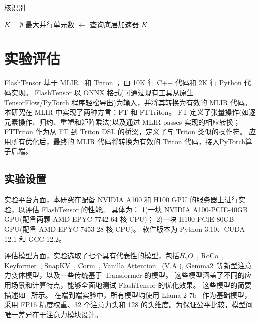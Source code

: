 \begin{algorithm}[ht]
{
\caption{核识别}
    \label{alg:kernel_identify}
     { 
        $K = \emptyset $\; 
        最大并行单元数 $\leftarrow$ 查询底层加速器\;
        \Return $K$\;
    }
}
\end{algorithm}

\section{实验评估}
FlashTensor 基于 MLIR~\cite {lattner2020mlir} 和 Triton~\cite {tillet2019triton}，由 10K 行 C++ 代码和 2K 行 Python 代码实现。
FlashTensor 以 ONNX 格式(可通过现有工具从原生 TensorFlow/PyTorch 程序轻松导出)为输入，并将其转换为有效的 MLIR 代码。
本研究在 MLIR 中实现了两种方言：FT 和 FTTriton。
FT 定义了张量操作(如逐元素操作、归约、重塑和矩阵乘法)以及通过 MLIR passes 实现的相应转换；
FTTriton 作为从 FT 到 Triton DSL 的桥梁，定义了与 Triton 类似的操作符。
应用所有优化后，最终的 MLIR 代码将转换为有效的 Triton 代码，接入PyTorch算子后端。

\subsection{实验设置}
实验平台方面，本研究在配备 NVIDIA A100 和 H100 GPU 的服务器上进行实验，以评估 FlashTensor 的性能。
具体为：
1)一块 NVIDIA A100-PCIE-40GB GPU(配备两颗 AMD EPYC 7742 64 核 CPU)；
2)一块 H100-PCIE-80GB GPU(配备 AMD EPYC 7453 28 核 CPU)。
软件版本为 Python 3.10、CUDA 12.1 和 GCC 12.2。

评估模型方面，实验选取了七个具有代表性的模型，包括\(H_{2}O\)~\cite{zhang2024h2o}, RoCo~\cite{ren2024roco}, Keyformer~\cite{adnan2024keyformer}, SnapKV~\cite{li2024snapkv}, Corm~\cite{dai2024corm}, Vanilla Attention~\cite{vaswani2017attention} (V.A.), Gemma2~\cite{team2024gemma2}等新型注意力变体模型，以及一些传统基于 Transformer 的模型。
这些模型涵盖了不同的应用场景和计算特点，能够全面地测试 FlashTensor 的优化效果。
这些模型的简要描述如~ 所示。
在端到端实验中，所有模型均使用  {Llama-2-7b}~\cite {touvron2023llama2} 作为基础模型，采用 FP16 精度权重、32 个注意力头和 128 的头维度。为保证公平比较，模型间唯一差异在于注意力模块设计。


